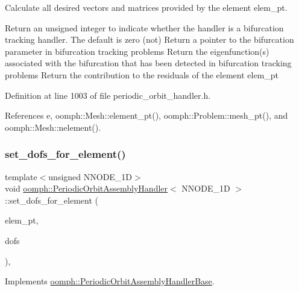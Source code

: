 Calculate all desired vectors and matrices provided by the element elem\+\_\+pt. 

Return an unsigned integer to indicate whether the handler is a bifurcation tracking handler. The default is zero (not) Return a pointer to the bifurcation parameter in bifurcation tracking problems Return the eigenfunction(s) associated with the bifurcation that has been detected in bifurcation tracking problems Return the contribution to the residuals of the element elem\+\_\+pt 

Definition at line 1003 of file periodic\+\_\+orbit\+\_\+handler.\+h.



References e, oomph\+::\+Mesh\+::element\+\_\+pt(), oomph\+::\+Problem\+::mesh\+\_\+pt(), and oomph\+::\+Mesh\+::nelement().

\mbox{\label{classoomph_1_1PeriodicOrbitAssemblyHandler_a3d1d9f709e983495dac3113b8e716843}} 
\subsubsection{\texorpdfstring{set\+\_\+dofs\+\_\+for\+\_\+element()}{set\_dofs\_for\_element()}}
{\footnotesize\ttfamily template$<$unsigned N\+N\+O\+D\+E\+\_\+1D$>$ \\
void \hyperlink{classoomph_1_1PeriodicOrbitAssemblyHandler}{oomph\+::\+Periodic\+Orbit\+Assembly\+Handler}$<$ N\+N\+O\+D\+E\+\_\+1D $>$\+::set\+\_\+dofs\+\_\+for\+\_\+element (\begin{DoxyParamCaption}\item[{\hyperlink{classoomph_1_1GeneralisedElement}{Generalised\+Element} $\ast$const}]{elem\+\_\+pt,  }\item[{\hyperlink{classoomph_1_1Vector}{Vector}$<$ double $>$ const \&}]{dofs }\end{DoxyParamCaption})\hspace{0.3cm}{\ttfamily [inline]}, {\ttfamily [virtual]}}



Implements \hyperlink{classoomph_1_1PeriodicOrbitAssemblyHandlerBase_a09d7c31dec8b9688cec82f8b24558b9b}{oomph\+::\+Periodic\+Orbit\+Assembly\+Handler\+Base}.



